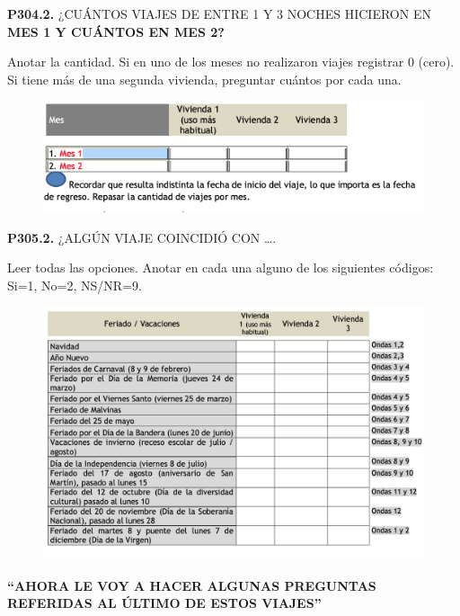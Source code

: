 \documentclass[
  openany]{book}
\begin{document}
\textbf{P304.2.} ¿CUÁNTOS VIAJES DE ENTRE 1 Y 3 NOCHES HICIERON EN \textbf{MES 1 Y CUÁNTOS EN MES 2?}

Anotar la cantidad. Si en uno de los meses no realizaron viajes registrar 0 (cero). Si tiene más de una segunda vivienda, preguntar cuántos por cada una.

\begin{figure}

{\centering \includegraphics[width=1\linewidth]{imagenes/figura6-160} 

}

\end{figure}

\textbf{P305.2.} ¿ALGÚN VIAJE COINCIDIÓ CON \ldots.

Leer todas las opciones. Anotar en cada una alguno de los siguientes códigos: Si=1, No=2, NS/NR=9.

\begin{figure}

{\centering \includegraphics[width=1\linewidth]{imagenes/figura6-161} 

}

\end{figure}

\textbf{``AHORA LE VOY A HACER ALGUNAS PREGUNTAS REFERIDAS AL ÚLTIMO DE ESTOS VIAJES''}
\end{document}
